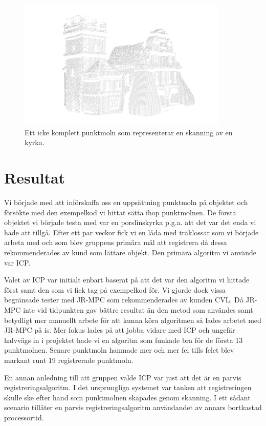 \begin{figure}[H]
	\centering
	\includegraphics[width=100mm]{figures/icke_komplett_moln_kyrka.png}
	\caption{Ett icke komplett punktmoln som representerar en skanning av en kyrka.}
	\label{fig:karlsson-single_scan-church}
\end{figure}


\section{Resultat}
\label{sec:results-karlsson}

Vi började med att införskaffa oss en uppsättning punktmoln på objektet och försökte med den exempelkod vi hittat sätta ihop punktmolnen. De första objektet vi började testa med var en porslinskyrka p.g.a. att det var det enda vi hade att tillgå. Efter ett par veckor fick vi en låda med träklossar som vi började arbeta med och som blev gruppens primära mål att registrera då dessa rekommenderades av kund som lättare objekt. Den primära algoritm vi använde var ICP. 

Valet av ICP var initialt enbart baserat på att det var den algoritm vi hittade först samt den som vi fick tag på exempelkod för. Vi gjorde dock vissa begränsade tester med JR-MPC som rekommenderades av kunden CVL. Då JR-MPC inte vid tidpunkten gav bättre resultat än den metod som användes samt betydligt mer manuellt arbete för att kunna köra algoritmen så lades arbetet med JR-MPC på is. Mer fokus lades på att jobba vidare med ICP och ungefär halvvägs in i projektet hade vi en algoritm som funkade bra för de första 13 punktmolnen. Senare punktmoln hamnade mer och mer fel tills felet blev markant runt 19 registrerade punktmoln. 

En annan anledning till att gruppen valde ICP var just att det är en parvis registreringsalgoritm. I det ursprungliga systemet var tanken att registreringen skulle ske efter hand som punktmolnen skapades genom skanning. I ett sådant scenario tillåter en parvis registreringsalgoritm användandet av annars bortkastad processortid.



